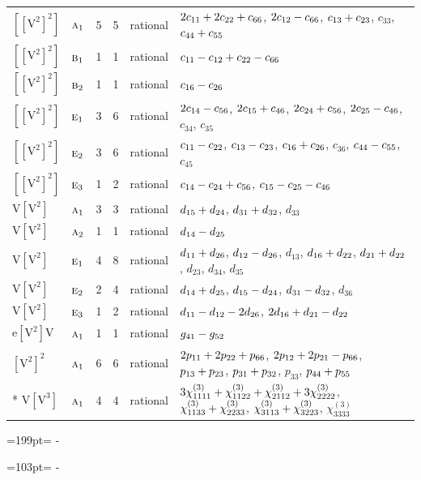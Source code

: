 \documentclass[10pt,a4paper]{article}
\newcommand{\needspace}[1]{\par\penalty-100\begingroup\dimen0=#1\relax\dimen2=\pagegoal
  \advance\dimen2-\pagetotal\ifdim\dimen0>\dimen2\relax\ifdim\dimen2>0pt\vfil\break\fi\fi
  \endgroup}
\numberwithin{equation}{section}
\newcommand{\irr}[1]{\text{\normalfont\scshape #1}}
\newcommand{\jahn}[1]{\mathrm{#1}}
\newlength{\fillwidth}\newlength{\cellwidth}\newlength{\colwidth}
\newcommand{\signbreak}{\penalty100\relax}
\begin{document}
{\begin{longtable}{@{}llrrl>{\RaggedRight\arraybackslash}p{\fillwidth}@{}}
$\jahn{[[V^{2}]^{2}]}$ & $\irr{a}_{1}$ & 5 & 5 & rational & $2c_{11} +\signbreak 2c_{22} +\signbreak c_{66}$, $2c_{12} -\signbreak c_{66}$, $c_{13} +\signbreak c_{23}$, $c_{33}$, $c_{44} +\signbreak c_{55}$\\
$\jahn{[[V^{2}]^{2}]}$ & $\irr{b}_{1}$ & 1 & 1 & rational & $c_{11} -\signbreak c_{12} +\signbreak c_{22} -\signbreak c_{66}$\\
$\jahn{[[V^{2}]^{2}]}$ & $\irr{b}_{2}$ & 1 & 1 & rational & $c_{16} -\signbreak c_{26}$\\
$\jahn{[[V^{2}]^{2}]}$ & $\irr{e}_{1}$ & 3 & 6 & rational & $2c_{14} -\signbreak c_{56}$, $2c_{15} +\signbreak c_{46}$, $2c_{24} +\signbreak c_{56}$, $2c_{25} -\signbreak c_{46}$, $c_{34}$, $c_{35}$\\
$\jahn{[[V^{2}]^{2}]}$ & $\irr{e}_{2}$ & 3 & 6 & rational & $c_{11} -\signbreak c_{22}$, $c_{13} -\signbreak c_{23}$, $c_{16} +\signbreak c_{26}$, $c_{36}$, $c_{44} -\signbreak c_{55}$, $c_{45}$\\
$\jahn{[[V^{2}]^{2}]}$ & $\irr{e}_{3}$ & 1 & 2 & rational & $c_{14} -\signbreak c_{24} +\signbreak c_{56}$, $c_{15} -\signbreak c_{25} -\signbreak c_{46}$\\
$\jahn{V[V^{2}]}$ & $\irr{a}_{1}$ & 3 & 3 & rational & $d_{15} +\signbreak d_{24}$, $d_{31} +\signbreak d_{32}$, $d_{33}$\\
$\jahn{V[V^{2}]}$ & $\irr{a}_{2}$ & 1 & 1 & rational & $d_{14} -\signbreak d_{25}$\\
$\jahn{V[V^{2}]}$ & $\irr{e}_{1}$ & 4 & 8 & rational & $d_{11} +\signbreak d_{26}$, $d_{12} -\signbreak d_{26}$, $d_{13}$, $d_{16} +\signbreak d_{22}$, $d_{21} +\signbreak d_{22}$, $d_{23}$, $d_{34}$, $d_{35}$\\
$\jahn{V[V^{2}]}$ & $\irr{e}_{2}$ & 2 & 4 & rational & $d_{14} +\signbreak d_{25}$, $d_{15} -\signbreak d_{24}$, $d_{31} -\signbreak d_{32}$, $d_{36}$\\
$\jahn{V[V^{2}]}$ & $\irr{e}_{3}$ & 1 & 2 & rational & $d_{11} -\signbreak d_{12} -\signbreak 2d_{26}$, $2d_{16} +\signbreak d_{21} -\signbreak d_{22}$\\
$\jahn{e[V^{2}]V}$ & $\irr{a}_{1}$ & 1 & 1 & rational & $\mathnormal{g}_{41} -\signbreak \mathnormal{g}_{52}$\\
$\jahn{[V^{2}]^{2}}$ & $\irr{a}_{1}$ & 6 & 6 & rational & $2p_{11} +\signbreak 2p_{22} +\signbreak p_{66}$, $2p_{12} +\signbreak 2p_{21} -\signbreak p_{66}$, $p_{13} +\signbreak p_{23}$, $p_{31} +\signbreak p_{32}$, $p_{33}$, $p_{44} +\signbreak p_{55}$\\*
$\jahn{V[V^{3}]}$ & $\irr{a}_{1}$ & 4 & 4 & rational & $3\chi^{(3)}_{1111} +\signbreak \chi^{(3)}_{1122} +\signbreak \chi^{(3)}_{2112} +\signbreak 3\chi^{(3)}_{2222}$, $\chi^{(3)}_{1133} +\signbreak \chi^{(3)}_{2233}$, $\chi^{(3)}_{3113} +\signbreak \chi^{(3)}_{3223}$, $\chi^{(3)}_{3333}$\\
\bottomrule\end{longtable}}
\needspace{199pt}
\needspace{103pt}
\end{document}
